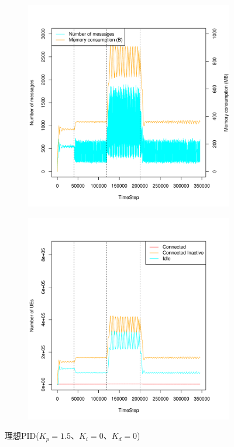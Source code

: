 \documentclass[a4j]{ujarticle}
\begin{document}
\begin{figure}[htbp]
\begin{subfigure}{0.49\hsize}
   \centering
   \includegraphics[width=1.0\hsize]{scenario_7_signaling_and_memoryload_vs_timeStep_0_691200_1-5_0_0_0_addIn6000s_random.pdf}
   \label{subfig:scenario_7_signaling_and_memoryload_vs_timeStep_0_691200_1-5_0_0_0_addIn6000s_random}
 \end{subfigure}
 \begin{subfigure}{0.49\hsize}
   \centering
   \includegraphics[width=1.0\hsize]{scenario_7_stateBreakdown_0_691200_1-5_0_0_0_addIn6000s_random.pdf}
   \label{subfig:scenario_7_stateBreakdown_0_691200_1-5_0_0_0_addIn6000s_random}
 \end{subfigure}
 \caption{理想PID($K_p = 1.5、K_i = 0、K_d = 0$)}
 \label{fig:result_p_scenario7_addIn6000s_random}
\end{figure}
\end{document}
